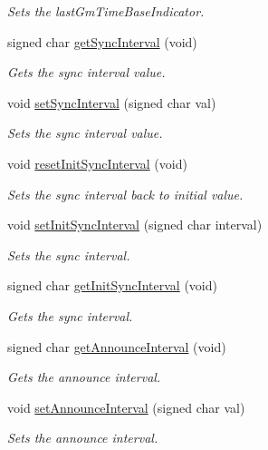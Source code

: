 \begin{DoxyCompactItemize}
\begin{DoxyCompactList}\small\item\em Sets the last\+Gm\+Time\+Base\+Indicator. \end{DoxyCompactList}\item 
signed char \hyperlink{class_common_port_a963da67f8dd0b8c72bd19ca91c3ce00d}{get\+Sync\+Interval} (void)
\begin{DoxyCompactList}\small\item\em Gets the sync interval value. \end{DoxyCompactList}\item 
void \hyperlink{class_common_port_a0aff2cd89fbc637b4b883a47728f94df}{set\+Sync\+Interval} (signed char val)
\begin{DoxyCompactList}\small\item\em Sets the sync interval value. \end{DoxyCompactList}\item 
void \hyperlink{class_common_port_a7e4b6dfc0822ebebb0874ed2bdd91b10}{reset\+Init\+Sync\+Interval} (void)
\begin{DoxyCompactList}\small\item\em Sets the sync interval back to initial value. \end{DoxyCompactList}\item 
void \hyperlink{class_common_port_a1af3691c565a65c9212b3f0adf1f76ac}{set\+Init\+Sync\+Interval} (signed char interval)
\begin{DoxyCompactList}\small\item\em Sets the sync interval. \end{DoxyCompactList}\item 
signed char \hyperlink{class_common_port_af10585c4e9853d5a958933d5c5357445}{get\+Init\+Sync\+Interval} (void)
\begin{DoxyCompactList}\small\item\em Gets the sync interval. \end{DoxyCompactList}\item 
signed char \hyperlink{class_common_port_a7aa1a5fddf7129f600c97c018087b7b8}{get\+Announce\+Interval} (void)
\begin{DoxyCompactList}\small\item\em Gets the announce interval. \end{DoxyCompactList}\item 
void \hyperlink{class_common_port_a55a6b4ff487cd157501f921a27db0d9c}{set\+Announce\+Interval} (signed char val)
\begin{DoxyCompactList}\small\item\em Sets the announce interval. \end{DoxyCompactList}\item 

\end{DoxyCompactItemize}
